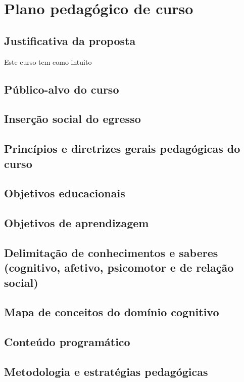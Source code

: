 \newpage
\chapter{Plano pedagógico de curso}

\section{Justificativa da proposta}

Este curso tem como intuito 

\section{Público-alvo do curso}

\section{Inserção social do egresso}

\section{Princípios e diretrizes gerais pedagógicas do curso}

\section{Objetivos educacionais}

\section{Objetivos de aprendizagem}

\section{Delimitação de conhecimentos e saberes (cognitivo, afetivo, psicomotor e  de relação social)}

\section{Mapa de conceitos do domínio cognitivo}

\section{Conteúdo programático}
\newpage
\section{Metodologia e estratégias pedagógicas}

